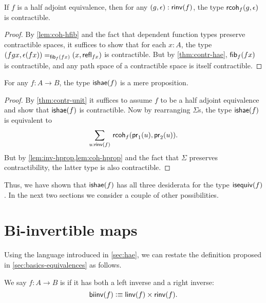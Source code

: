 \begin{lem}\label{lem:coh-hprop}
  If $f$ is a half adjoint equivalence, then for any $(g,\epsilon) : \rinv(f)$, the type $\rcoh{f}{g}{\epsilon}$ is contractible.
\end{lem}
\begin{proof}
  By \autoref{lem:coh-hfib} and the fact that dependent function types preserve contractible spaces, it suffices to show that for each $x:A$, the type $\id[\hfib{f}{fx}]{(fgx,\epsilon(fx))}{(x,\refl{fx})}$ is contractible.
  But by \autoref{thm:contr-hae}, $\hfib{f}{fx}$ is contractible, and any path space of a contractible space is itself contractible.
\end{proof}

\begin{thm}\label{thm:hae-hprop}
  For any $f : A \to B$, the type $\ishae(f)$ is a mere proposition.
\end{thm}
\begin{proof}
  By \autoref{thm:contr-unit} it suffices to assume $f$ to be a half adjoint equivalence and show that $\ishae(f)$ is contractible.
  Now by rearranging $\Sigma$s, the type $\ishae(f)$ is equivalent to
  \[\sm{u : \rinv(f)} \rcoh{f}{\proj{1}(u)}{\proj{2}(u)}.\]
  But by \cref{lem:inv-hprop,lem:coh-hprop} and the fact that $\Sigma$ preserves contractibility, the latter type is also contractible.
\end{proof}

Thus, we have shown that $\ishae(f)$ has all three desiderata for the type $\isequiv(f)$.
In the next two sections we consider a couple of other possibilities.

%
%
%

\section{Bi-invertible maps}
\label{sec:biinv}

%
%
%

Using the language introduced in \autoref{sec:hae}, we can restate the definition proposed in \autoref{sec:basics-equivalences} as follows.

\begin{defn}\label{defn:biinv}
  We say $f:A\to B$ is 
  if it has both a left inverse and a right inverse:
  \[ \biinv (f) \defeq \linv(f) \times \rinv(f). \]
\end{defn}

